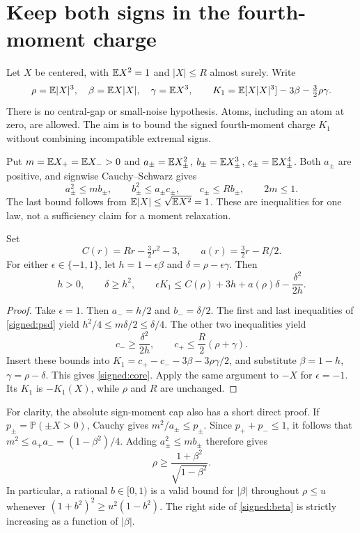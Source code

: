 \section{Keep both signs in the fourth-moment charge}

Let $X$ be centered, with $\mathbb E X^2=1$ and $|X|\le R$ almost surely.
Write
\[
 \rho=\mathbb E|X|^3,\quad\beta=\mathbb E X|X|,\quad\gamma=\mathbb E X^3,
 \qquad K_1=\mathbb E[X|X|^3]-3\beta-\tfrac32\rho\gamma.
\]
There is no central-gap or small-noise hypothesis. Atoms, including an
atom at zero, are allowed. The aim is to bound the signed fourth-moment
charge $K_1$ without combining incompatible extremal signs.

Put $m=\mathbb E X_+=\mathbb E X_->0$ and
$a_\pm=\mathbb E X_\pm^2$, $b_\pm=\mathbb E X_\pm^3$, $c_\pm=\mathbb E X_\pm^4$.
Both $a_\pm$ are positive, and signwise Cauchy--Schwarz gives
\begin{equation}\label{signed:psd}
 a_\pm^2\le m b_\pm,\qquad b_\pm^2\le a_\pm c_\pm,
 \qquad c_\pm\le Rb_\pm,\qquad 2m\le1.
\end{equation}
The last bound follows from $\mathbb E|X|\le\sqrt{\mathbb E X^2}=1$.
These are inequalities for one law, not a sufficiency claim for a moment
relaxation.

\begin{lemma}\label{signed:lemma}
Set
\[
 C(r)=Rr-\tfrac32r^2-3,\qquad a(r)=\tfrac32r-R/2.
\]
For either $\epsilon\in\{-1,1\}$, let
$h=1-\epsilon\beta$ and $\delta=\rho-\epsilon\gamma$. Then
\begin{equation}\label{signed:core}
 h>0,\qquad\delta\ge h^2,\qquad
 \epsilon K_1\le C(\rho)+3h+a(\rho)\delta-\frac{\delta^2}{2h}.
\end{equation}
\end{lemma}
\begin{proof}
Take $\epsilon=1$. Then $a_-=h/2$ and $b_-=\delta/2$.
The first and last inequalities of \eqref{signed:psd} yield
$h^2/4\le m\delta/2\le\delta/4$.
The other two inequalities yield
\[
 c_-\ge\frac{\delta^2}{2h},\qquad
 c_+\le\frac R2(\rho+\gamma).
\]
Insert these bounds into
$K_1=c_+-c_--3\beta-3\rho\gamma/2$, and substitute
$\beta=1-h$, $\gamma=\rho-\delta$. This gives
\eqref{signed:core}. Apply the same argument to $-X$ for
$\epsilon=-1$. Its $K_1$ is $-K_1(X)$, while $\rho$ and $R$ are unchanged.
\end{proof}

For clarity, the absolute sign-moment cap also has a short direct proof.
If $p_\pm=\mathbb P(\pm X>0)$, Cauchy gives
$m^2/a_\pm\le p_\pm$. Since $p_++p_-\le1$, it follows that
$m^2\le a_+a_-=(1-\beta^2)/4$.
Adding $a_\pm^2\le mb_\pm$ therefore gives
\begin{equation}\label{signed:beta}
 \rho\ge\frac{1+\beta^2}{\sqrt{1-\beta^2}}.
\end{equation}
In particular, a rational $b\in[0,1)$ is a valid bound for $|\beta|$
throughout $\rho\le u$ whenever
$(1+b^2)^2\ge u^2(1-b^2)$. The right side of
\eqref{signed:beta} is strictly increasing as a function of $|\beta|$.

